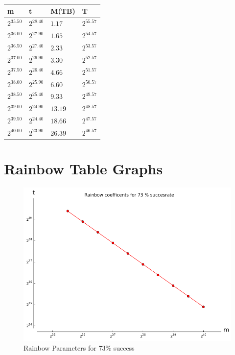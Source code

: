 \begin{table}[h!]\centering
  \begin{tabular}{llll}
    m & t & M(TB) & T \\ \hline
    $2^{35.50}$ & $2^{28.40}$ & $1.17$ & $2^{55.57}$ \\
    $2^{36.00}$ & $2^{27.90}$ & $1.65$ & $2^{54.57}$ \\
    $2^{36.50}$ & $2^{27.40}$ & $2.33$ & $2^{53.57}$ \\
    $2^{37.00}$ & $2^{26.90}$ & $3.30$ & $2^{52.57}$ \\
    $2^{37.50}$ & $2^{26.40}$ & $4.66$ & $2^{51.57}$ \\
    $2^{38.00}$ & $2^{25.90}$ & $6.60$ & $2^{50.57}$ \\
    $2^{38.50}$ & $2^{25.40}$ & $9.33$ & $2^{49.57}$ \\
    $2^{39.00}$ & $2^{24.90}$ & $13.19$ & $2^{48.57}$ \\
    $2^{39.50}$ & $2^{24.40}$ & $18.66$ & $2^{47.57}$ \\
    $2^{40.00}$ & $2^{23.90}$ & $26.39$ & $2^{46.57}$ \\
  \end{tabular}
\end{table}
\section{Rainbow Table Graphs}
\label{sec:rainbowgraphs}
\begin{figure}[H]
  \centering
  \includegraphics[scale=0.5]{figures/RainbowCoef73.png}
  \caption{Rainbow Parameters for 73\% success}
\end{figure}

